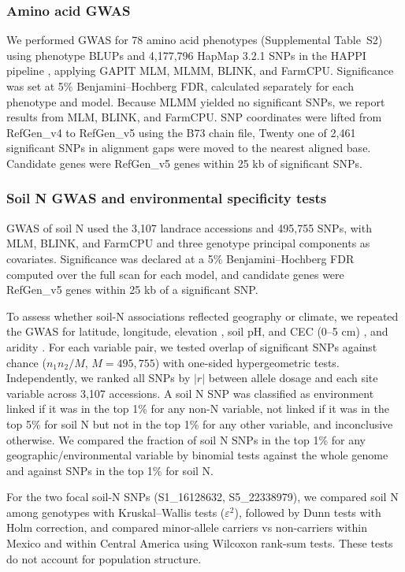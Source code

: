\documentclass[namedate,unnumsec,webpdf,contemporary,large]{oup-authoring-template}
\begin{document}
\subsubsection{Amino acid GWAS}
We performed GWAS for 78 amino acid phenotypes (Supplemental Table~S2) using phenotype BLUPs and 4,177,796 HapMap 3.2.1 SNPs in the HAPPI pipeline \citep{Slaten2020HAPPI}, applying GAPIT MLM, MLMM, BLINK, and FarmCPU. Significance was set at 5\% Benjamini--Hochberg FDR, calculated separately for each phenotype and model. Because MLMM yielded no significant SNPs, we report results from MLM, BLINK, and FarmCPU. SNP coordinates were lifted from RefGen\_v4 to RefGen\_v5 using the B73 chain file, Twenty one of 2,461 significant SNPs in alignment gaps were moved to the nearest aligned base. Candidate genes were RefGen\_v5 genes within 25 kb of significant SNPs.

\subsubsection{Soil N GWAS and environmental specificity tests}
GWAS of soil N used the 3,107 landrace accessions and 495,755 SNPs, with MLM, BLINK, and FarmCPU \citep{Slaten2020HAPPI} and three genotype principal components as covariates. Significance was declared at a 5\% Benjamini--Hochberg FDR computed over the full scan for each model, and candidate genes were RefGen\_v5 genes within 25 kb of a significant SNP.

To assess whether soil-N associations reflected geography or climate, we repeated the GWAS for latitude, longitude, elevation \citep{RomeroNavarro2017Landraces}, soil pH, and CEC (0--5 cm) \citep{Poggio2021SoilGrids}, and aridity \citep{Zomer2022Aridity}. For each variable pair, we tested overlap of significant SNPs against chance ($n_1 n_2 / M$, $M = 495{,}755$) with one-sided hypergeometric tests. Independently, we ranked all SNPs by $|r|$ between allele dosage and each site variable across 3,107 accessions. A soil N SNP was classified as environment linked if it was in the top 1\% for any non-N variable, not linked if it was in the top 5\% for soil N but not in the top 1\% for any other variable, and inconclusive otherwise. We compared the fraction of soil N SNPs in the top 1\% for any geographic/environmental variable by binomial tests against the whole genome and against SNPs in the top 1\% for soil N.

For the two focal soil-N SNPs (S1\_16128632, S5\_22338979), we compared soil N among genotypes with Kruskal--Wallis tests ($\varepsilon^2$), followed by Dunn tests with Holm correction, and compared minor-allele carriers vs non-carriers within Mexico and within Central America using Wilcoxon rank-sum tests. These tests do not account for population structure.
\end{document}
